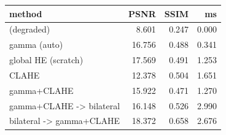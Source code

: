 \begin{tabular}{lrrr}
\toprule
method & PSNR & SSIM & ms \\
\midrule
(degraded) & 8.601 & 0.247 & 0.000 \\
gamma (auto) & 16.756 & 0.488 & 0.341 \\
global HE (scratch) & 17.569 & 0.491 & 1.253 \\
CLAHE & 12.378 & 0.504 & 1.651 \\
gamma+CLAHE & 15.922 & 0.471 & 1.270 \\
gamma+CLAHE -> bilateral & 16.148 & 0.526 & 2.990 \\
bilateral -> gamma+CLAHE & 18.372 & 0.658 & 2.676 \\
\bottomrule
\end{tabular}
